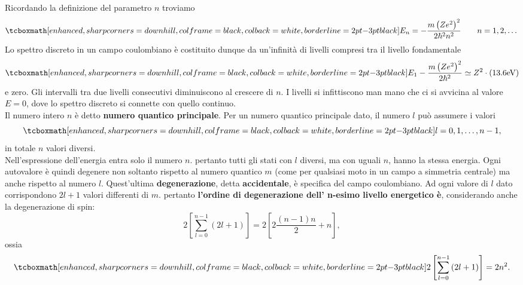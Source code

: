 Ricordando la definizione del parametro $n$ troviamo
	\begin{equation}
		\tcboxmath[enhanced, sharp corners=downhill, colframe=black, colback=white, borderline={2pt}{-3pt}{black}]{
			E_n= -\frac{m\left(Ze^2\right) ^2}{2\hbar ^2 n^2}
			}\qquad n=1,2,\dots
	\end{equation}
Lo spettro discreto in un campo coulombiano è costituito dunque da un'infinità di livelli compresi tra il livello fondamentale
	\begin{equation}
		\tcboxmath[enhanced, sharp corners=downhill, colframe=black, colback=white, borderline={2pt}{-3pt}{black}]{
			E_1-\frac{m\left(Ze^2\right) ^2}{2\hbar ^2 }\simeq Z^2\cdot \left(13.6 \textrm{eV}\right)
			}
	\end{equation}
e zero. Gli intervalli tra due livelli consecutivi diminuiscono al crescere di $n$. I livelli si infittiscono man mano che ci si avvicina al valore $E=0$, dove lo spettro discreto si connette con quello continuo.\\

Il numero intero $n$ è detto \textbf{numero quantico principale}. Per un numero quantico principale dato, il numero $l$ può assumere i valori
	\begin{equation}
		\tcboxmath[enhanced, sharp corners=downhill, colframe=black, colback=white, borderline={2pt}{-3pt}{black}]{
			l=0,1,\dots,n-1,
			}
	\end{equation}
in totale $n$ valori diversi.\\

Nell'espressione dell'energia entra solo il numero $n$. pertanto tutti gli stati con $l$ diversi, ma con uguali $n$, hanno la stessa energia. Ogni autovalore è quindi degenere non soltanto rispetto al numero quantico $m$ (come per qualsiasi moto in un campo a simmetria centrale) ma anche rispetto al numero $l$. Quest'ultima \textbf{degenerazione}, detta \textbf{accidentale}, è specifica del campo coulombiano. Ad ogni valore di $l$ dato corrispondono $2l+1$ valori differenti di $m$. pertanto \textbf{l'ordine di degenerazione dell' n-esimo livello energetico è}, considerando anche la degenerazione di spin:
	\begin{equation}
		2 \left[ \sum _{l=0} ^{n-1} \left(2l+1 \right)\right]=2 \left[ 2\frac{\left( n-1 \right) n}{2}+n\right],
	\end{equation}
ossia
	\begin{equation}
		\tcboxmath[enhanced, sharp corners=downhill, colframe=black, colback=white, borderline={2pt}{-3pt}{black}]{
			2 \left[ \sum _{l=0} ^{n-1} \left(2l+1 \right)\right]= 2n^2.
			}
	\end{equation}\\
	
